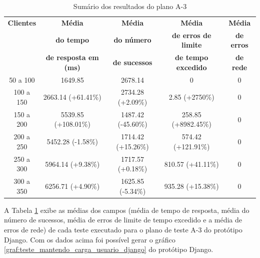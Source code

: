   \begin{table}[H]
    \centering
    \footnotesize
    \setlength{\abovecaptionskip}{0pt}
    \setlength{\belowcaptionskip}{0pt}
    \caption[Sumário dos resultados do plano A-3]{Sumário dos resultados do plano A-3}
    \label{tab:sumario-resultado-plano-teste-a-3}
    \begin{tabular}{c|c|c|c|c}
      \hline \hline
      \textbf{Clientes} & \textbf{Média} &	\textbf{Média} & \textbf{Média} & \textbf{Média}  \\
      {}		& \textbf{do tempo} &   \textbf{do número } & \textbf{de erros de limite} & \textbf{de erros}  \\
      {}		& \textbf{de resposta em (ms) } &\textbf{de sucessos } & \textbf{de tempo excedido} & \textbf{de rede} \\
      \hline \hline
      50 a 100 &		1649.85 &			2678.14 & 			0 &				0 \\
      100 a 150&		2663.14 (+61.41\%)&		2734.28 (+2.09\%)& 		2.85 (+2750\%) &		0 \\
      150 a 200&		5539.85 (+108.01\%)&		1487.42 (-45.60\%)& 		258.85 (+8982.45\%) &		0 \\
      200 a 250&		5452.28 (-1.58\%)&		1714.42 (+15.26\%)& 		574.42 (+121.91\%) &		0 \\
      250 a 300&		5964.14 (+9.38\%)&		1717.57 (+0.18\%)& 		810.57 (+41.11\%) &		0 \\
      300 a 350&		6256.71 (+4.90\%)&		1625.85 (-5.34\%)& 		935.28 (+15.38\%) &		0 \\
      \hline \hline
    \end{tabular}
  \end{table}

  A Tabela \ref{tab:sumario-resultado-plano-teste-a-3} exibe as médias dos campos (média de tempo de resposta,
  média do número de sucessos, média de erros de limite de tempo excedido e a média de erros de rede) de cada teste executado
  para o plano de teste A-3 do protótipo Django.
  Com os dados acima foi possível gerar o gráfico \ref{graf:teste_mantendo_carga_usuario_django} do
  protótipo Django.

